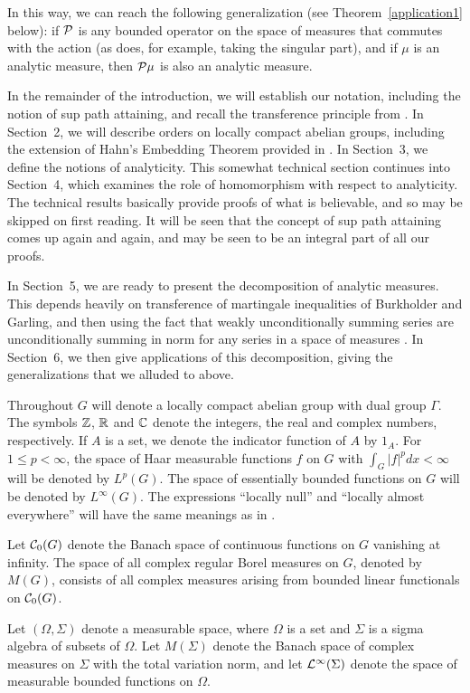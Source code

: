 \documentclass[12pt,leqno]{article}
\def\R{\Bbb R}
\def\C{\Bbb C}
\def\Z{\Bbb Z}
\def\O{\Omega}
\def\cL{{\cal L}}
\def\cC{{\cal C}}
\begin{document}
In this way, we can reach the following generalization
(see Theorem~\ref{application1} below): if $\cal P$ is any
bounded operator on the space of measures that commutes with the action
(as does, for example, taking the singular part), and if $\mu$ is an
analytic measure, then ${\cal P}\mu$ is also an analytic measure.

In the remainder of the introduction, we will establish our notation,
including the notion of sup path attaining,
and recall the transference principle from \cite{amss}.  In Section~2,
we will describe orders on locally compact abelian groups, including
the extension of Hahn's Embedding Theorem provided in \cite{ams}.
In Section~3, we define the notions of analyticity.  This somewhat
technical section continues into Section~4, which examines the role
of homomorphism with respect to analyticity.  The technical results
basically provide proofs of what is believable, and so may be skipped
on first reading.  It will be seen that the concept of sup path attaining
comes up again and again, and may be seen to be an integral part of all
our proofs.

In Section~5, we are ready to present the decomposition of
analytic measures.  This depends heavily on transference of martingale 
inequalities of Burkholder and Garling, and then using the fact 
 that weakly unconditionally summing series are
unconditionally summing in norm for any series in a space of measures \cite{bp}.
In Section~6, we then give applications of this decomposition,
giving the generalizations that we alluded to above.

Throughout $G$ will denote a 
locally compact abelian group with dual group
$\Gamma$.  
The symbols $\Z$, $\R$ and $\C$ 
denote the integers, the real and complex numbers, respectively.  
If $A$ is a set, we denote the indicator
function of $A$ by $1_A$.
For $1\leq p<\infty$,
the space of Haar measurable functions $f$ on $G$ with
$\int_G|f|^p dx<\infty$ will be denoted by 
$L^p(G)$.  The space of essentially
bounded functions on $G$ will be denoted by 
$L^\infty(G)$.  The expressions ``locally null''
and ``locally almost everywhere'' will have the same meanings as
in \cite[Definition (11.26)]{hr1}.

Let $\cC_0(G)$ denote
the Banach space of continuous functions on
$G$ vanishing at infinity. 
The space of all complex regular Borel measures 
on $G$,
denoted by $M(G)$, consists of all complex measures  
arising from bounded linear functionals on $\cC_0(G)$.

Let $(\O, \Sigma)$ denote a
measurable space, 
where $\O$ is a set and $\Sigma$ is a
sigma algebra of subsets of $\O$.  Let $M(\Sigma)$ denote the 
Banach space of complex measures on $\Sigma$ with the
total variation norm, and let
$\cL^\infty(\Sigma)$ denote the space of measurable
bounded functions on $\Omega$.  
\end{document}
